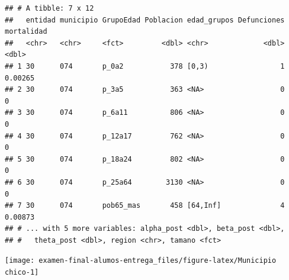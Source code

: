 \documentclass[
]{article}
\newenvironment{Shaded}{\begin{snugshade}}{\end{snugshade}}
\newcommand{\DataTypeTok}[1]{\textcolor[rgb]{0.13,0.29,0.53}{#1}}
\newcommand{\KeywordTok}[1]{\textcolor[rgb]{0.13,0.29,0.53}{\textbf{#1}}}
\newcommand{\NormalTok}[1]{#1}
\newcommand{\OperatorTok}[1]{\textcolor[rgb]{0.81,0.36,0.00}{\textbf{#1}}}
\newcommand{\StringTok}[1]{\textcolor[rgb]{0.31,0.60,0.02}{#1}}
\begin{document}
\begin{verbatim}
## # A tibble: 7 x 12
##   entidad municipio GrupoEdad Poblacion edad_grupos Defunciones mortalidad
##   <chr>   <chr>     <fct>         <dbl> <chr>             <dbl>      <dbl>
## 1 30      074       p_0a2           378 [0,3)                 1    0.00265
## 2 30      074       p_3a5           363 <NA>                  0    0      
## 3 30      074       p_6a11          806 <NA>                  0    0      
## 4 30      074       p_12a17         762 <NA>                  0    0      
## 5 30      074       p_18a24         802 <NA>                  0    0      
## 6 30      074       p_25a64        3130 <NA>                  0    0      
## 7 30      074       pob65_mas       458 [64,Inf]              4    0.00873
## # ... with 5 more variables: alpha_post <dbl>, beta_post <dbl>,
## #   theta_post <dbl>, region <chr>, tamano <fct>
\end{verbatim}

\begin{Shaded}
\end{Shaded}

\begin{center}\texttt{[image: examen-final-alumos-entrega\_files/figure-latex/Municipio chico-1]} \end{center}

\begin{Shaded}
\end{Shaded}
\end{document}
